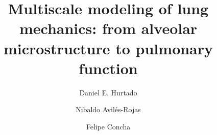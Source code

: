 \documentclass[preprint,3p,12pt,number,sort&compress]{elsarticle}
\begin{document}
\begin{frontmatter}

\title{Multiscale modeling of lung mechanics: from alveolar microstructure to pulmonary function}




\author[ice,ibm,mit,cor1]{Daniel E. Hurtado}
\author[ice,ibm]{Nibaldo Avil\'es-Rojas}
\author[ice]{Felipe Concha}
\address[ice]{Department of Structural and Geotechnical Engineering, School of Engineering, Pontificia Universidad Cat\'olica de Chile, Santiago, Chile, Vicu\~na Mackenna 4860, Santiago, Chile}
\address[ibm]{Institute for Biological and Medical Engineering, Schools of Engineering, Medicine and Biological Sciences, Pontificia Universidad Cat\'olica de Chile, Vicu\~na Mackenna 4860, Santiago, Chile}
\address[mit]{Institute for Medical Engineering and Science, Massachusetts Institute of Technology, Cambridge, MA, 02140, USA}


\end{frontmatter}
\end{document}
